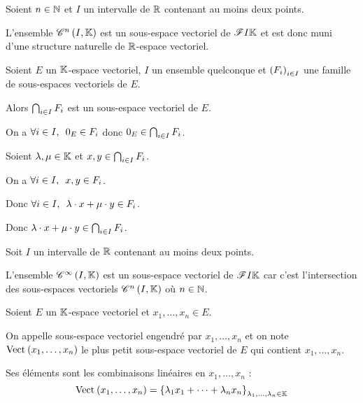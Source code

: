 \begin{ex}
Soient \(n\in\mathbb{N}\) et \(I\) un intervalle de \(\mathbb{R}\) contenant au moins deux points.

L'ensemble \(\mathscr{C}^{n}\left(I,\mathbb{K}\right)\) est un sous-espace vectoriel de \(\mathscr{F}{I}{\mathbb{K}}\) et est donc muni d'une structure naturelle de \(\mathbb{R}\)-espace vectoriel.
\end{ex}

\begin{prop}
Soient \(E\) un \(\mathbb{K}\)-espace vectoriel, \(I\) un ensemble quelconque et \(\left(F_i\right)_{i\in I}\) une famille de sous-espaces vectoriels de \(E\).

Alors \(\bigcap_{i\in I}F_i\) est un sous-espace vectoriel de \(E\).
\end{prop}

\begin{dem}
On a \(\quantifs{\forall i\in I}0_E\in F_i\) donc \(0_E\in\bigcap_{i\in I}F_i\).

Soient \(\lambda,\mu\in\mathbb{K}\) et \(x,y\in\bigcap_{i\in I}F_i\).

On a \(\quantifs{\forall i\in I}x,y\in F_i\).

Donc \(\quantifs{\forall i\in I}\lambda\cdot x+\mu\cdot y\in F_i\).

Donc \(\lambda\cdot x+\mu\cdot y\in\bigcap_{i\in I}F_i\).
\end{dem}

\begin{ex}
Soit \(I\) un intervalle de \(\mathbb{R}\) contenant au moins deux points.

L'ensemble \(\mathscr{C}^{\infty}\left(I,\mathbb{K}\right)\) est un sous-espace vectoriel de \(\mathscr{F}{I}{\mathbb{K}}\) car c'est l'intersection des sous-espaces vectoriels \(\mathscr{C}^{n}\left(I,\mathbb{K}\right)\) où \(n\in\mathbb{N}\).
\end{ex}

\begin{defprop}
Soient \(E\) un \(\mathbb{K}\)-espace vectoriel et \(x_1,\dots,x_n\in E\).

On appelle sous-espace vectoriel engendré par \(x_1,\dots,x_n\) et on note \(\Vect{x_1,\dots,x_n}\) le plus petit sous-espace vectoriel de \(E\) qui contient \(x_1,\dots,x_n\).

Ses éléments sont les combinaisons linéaires en \(x_1,\dots,x_n\) : \[\Vect{x_1,\dots,x_n}=\accol{\lambda_1x_1+\dots+\lambda_nx_n}_{\lambda_1,\dots,\lambda_n\in\K}\]
\end{defprop}

